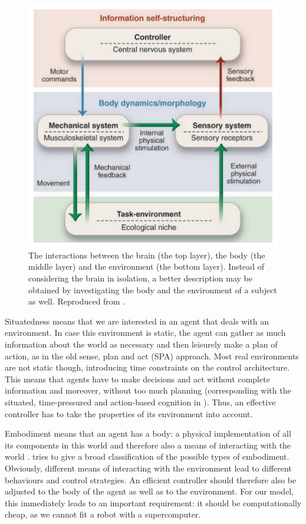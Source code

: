 \documentclass[10pt,a4paper]{report}
\begin{document}
\begin{figure}[bthp]
\begin{center}
\includegraphics[scale=0.5]{figures/EEC.png}
\caption{The interactions between the brain (the top layer), the body (the middle layer) and the environment (the bottom layer). Instead of considering the brain in isolation, a better description may be obtained by investigating the body and the environment of a subject as well. Reproduced from \citet{Pfeifer2007}. }
\label{EEC}
\end{center}
\end{figure}

Situatedness means that we are interested in an agent that deals with an environment. In case this environment is static, the agent can gather as much information about the world as necessary and then leisurely make a plan of action, as in the old sense, plan and act (SPA) approach. Most real environments are not static though, introducing time constraints on the control architecture. This means that agents have to make decisions and act without complete information and moreover, without too much planning (corresponding with the situated, time-pressured and action-based cognition in \citet{Wilson2002}). Thus, an effective controller has to take the properties of its environment into account.

Embodiment means that an agent has a body: a physical implementation of all its components in this world and therefore also a means of interacting with the world \citep{Pfeifer2007}. \citet{Ziemke2001} tries to give a broad classification of the possible types of embodiment. Obviously, different means of interacting with the environment lead to different behaviours and control strategies. An efficient controller should therefore also be adjusted to the body of the agent as well as to the environment. For our model, this immediately leads to an important requirement: it should be computationally cheap, as we cannot fit a robot with a supercomputer.
\end{document}
